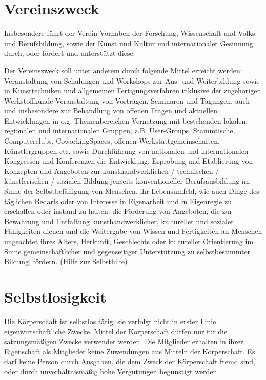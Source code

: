 \documentclass[a5paper, ngerman, 10pt]{scrreprt}
\begin{document}
\section{Vereinszweck}
\begin{compactenum}[(1)]
    \item Insbesondere führt der Verein Vorhaben der Forschung, Wissenschaft
        und Volks- und Berufsbildung, sowie der Kunst und Kultur und
        internationaler Gesinnung durch, oder fördert und unterstützt diese.
    \item Der Vereinszweck soll unter anderem durch folgende Mittel erreicht
        werden: Veranstaltung von Schulungen und Workshops zur Aus- und
        Weiterbildung sowie in Kunsttechniken und allgemeinen
        Fertigungsverfahren inklusive der zugehörigen Werkstoffkunde
        Veranstaltung von Vorträgen, Seminaren und Tagungen, auch und
        insbesondere zur Behandlung von offenen Fragen und aktuellen
        Entwicklungen in o.g. Themenbereichen Vernetzung mit bestehenden
        lokalen, regionalen und internationalen Gruppen, z.B.  User-Groups,
        Stammtische, Computerclubs, CoworkingSpaces, offenen
        Werkstattgemeinschaften, Künstlergruppen etc. sowie Durchführung von
        nationalen und internationalen Kongressen und Konferenzen die
        Entwicklung, Erprobung und Etablierung von Konzepten und Angeboten zur
        kunsthandwerklichen / technischen / künstlerischen / sozialen Bildung
        jenseits konventioneller Berufsausbildung im Sinne der Selbstbefähigung
        von Menschen, ihr Lebensumfeld, wie auch Dinge des täglichen Bedarfs
        oder von Interesse in Eigenarbeit und in Eigenregie zu erschaffen oder
        instand zu halten. die Förderung von Angeboten, die zur Bewahrung und
        Entfaltung kunsthandwerklicher, kultureller und sozialer Fähigkeiten
        dienen und die Weitergabe von Wissen und Fertigkeiten an Menschen
        ungeachtet ihres Alters, Herkunft, Geschlechts oder kultureller
        Orientierung im Sinne gemeinschaftlicher und gegenseitiger
        Unterstützung zu selbstbestimmter Bildung, fördern. (Hilfe zur
        Selbsthilfe)
\end{compactenum}


\section{Selbstlosigkeit}
Die Körperschaft ist selbstlos tätig; sie verfolgt nicht in erster Linie
eigenwirtschaftliche Zwecke. Mittel der Körperschaft dürfen nur für die
satzungsmäßigen Zwecke verwendet werden. Die Mitglieder erhalten in ihrer
Eigenschaft als Mitglieder keine Zuwendungen aus Mitteln der Körperschaft. Es
darf keine Person durch Ausgaben, die dem Zweck der Körperschaft fremd sind,
oder durch unverhältnismäßig hohe Vergütungen begünstigt werden.
\end{document}
